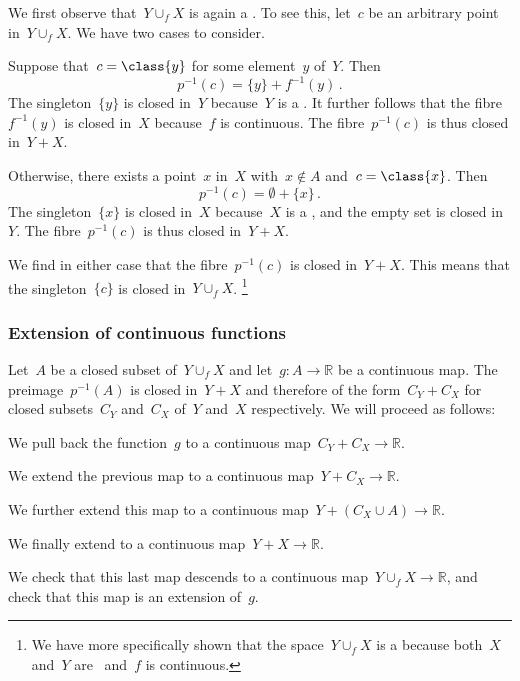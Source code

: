 We first observe that~$Y ∪_f X$ is again a .
To see this, let~$c$ be an arbitrary point in~$Y ∪_f X$.
We have two cases to consider.
\begin{casedistinction}

	\item
		Suppose that~$c = \class{y}$ for some element~$y$ of~$Y$.
		Then
		\[
			p^{-1}(c) = \{ y \} + f^{-1}(y) \,.
		\]
		The singleton~$\{ y \}$ is closed in~$Y$ because~$Y$ is a .
		It further follows that the fibre~$f^{-1}(y)$ is closed in~$X$ because~$f$ is continuous.
		The fibre~$p^{-1}(c)$ is thus closed in~$Y + X$.

	\item
		Otherwise, there exists a point~$x$ in~$X$ with~$x ∉ A$ and~$c = \class{x}$.
		Then
		\[
			p^{-1}(c) = ∅ + \{ x \} \,.
		\]
		The singleton~$\{ x \}$ is closed in~$X$ because~$X$ is a , and the empty set is closed in~$Y$.
		The fibre~$p^{-1}(c)$ is thus closed in~$Y + X$.

\end{casedistinction}
We find in either case that the fibre~$p^{-1}(c)$ is closed in~$Y + X$.
This means that the singleton~$\{ c \}$ is closed in~$Y ∪_f X$.%
\footnote{
	We have more specifically shown that the space~$Y ∪_f X$ is a  because both~$X$ and~$Y$ are~ and~$f$ is continuous.
}

\subsubsection*{Extension of continuous functions}

Let~$A$ be a closed subset of~$Y ∪_f X$ and let~$g \colon A \to ℝ$ be a continuous map.
The preimage~$p^{-1}(A)$ is closed in~$Y + X$ and therefore of the form~$C_Y + C_X$ for closed subsets~$C_Y$ and~$C_X$ of~$Y$ and~$X$ respectively.
We will proceed as follows:
\begin{enumerate*}

	\item
		We pull back the function~$g$ to a continuous map~$C_Y + C_X \to ℝ$.

	\item
		We extend the previous map to a continuous map~$Y + C_X \to ℝ$.

	\item
		We further extend this map to a continuous map~$Y + (C_X ∪ A) \to ℝ$.

	\item
		We finally extend to a continuous map~$Y + X \to ℝ$.

	\item
		We check that this last map descends to a continuous map~$Y ∪_f X \to ℝ$, and check that this map is an extension of~$g$.

\end{enumerate*}

